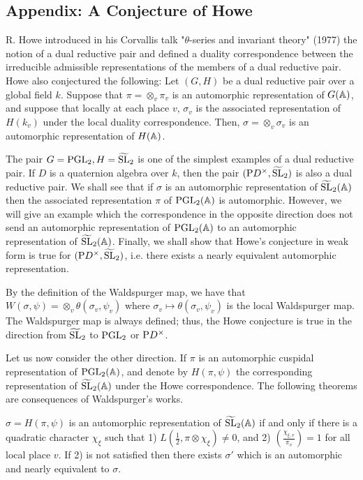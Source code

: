 \begin{appendices}
\section{Appendix: A Conjecture of Howe}

R. Howe introduced in his Corvallis talk "$\theta$-series and invariant theory" (1977) the notion of a dual reductive pair and defined a duality correspondence between the irreducible admissible representations of the members of a dual reductive pair.
Howe also conjectured the following: Let $(G, H)$ be a dual reductive pair over a global field $k$.
Suppose that $\pi = \otimes_v \pi_v$ is an automorphic representation of $G(\mathbb{A})$, and suppose that locally at each place $v$, $\sigma_v$ is the associated representation of $H(k_v)$ under the local duality correspondence.
Then, $\sigma = \otimes_v \sigma_v$ is an automorphic representation of $H(\mathbb{A})$.

The pair $G = \mathrm{PGL}_2, H = \widetilde{\mathrm{SL}}_2$ is one of the simplest examples of a dual reductive pair.
If $D$ is a quaternion algebra over $k$, then the pair $(\mathrm{P} D^\times, \widetilde{\mathrm{SL}}_2)$ is also a dual reductive pair. 
We shall see that if $\sigma$ is an automorphic representation of $\widetilde{\mathrm{SL}}_2(\mathbb{A})$ then the associated representation $\pi$ of $\mathrm{PGL}_2(\mathbb{A})$ is automorphic.
However, we will give an example which the correspondence in the opposite direction does not send an automorphic representation of $\mathrm{PGL}_2(\mathbb{A})$ to an automorphic representation of $\widetilde{\mathrm{SL}}_2(\mathbb{A})$.
Finally, we shall show that Howe's conjecture in weak
form is true for $(\mathrm{P} D^\times, \widetilde{\mathrm{SL}}_2)$, i.e. there exists a nearly equivalent automorphic representation.

By the definition of the Waldspurger map, we have that $W(\sigma, \psi) = \otimes_v \theta(\sigma_v, \psi_v)$ where $\sigma_v \mapsto \theta(\sigma_v, \psi_v)$ is the local Waldspurger map.
The Waldspurger map is always defined; thus, the Howe conjecture is true in the direction from $\widetilde{\mathrm{SL}}_2$ to $\mathrm{PGL}_2$ or $\mathrm{P} D^\times$.

Let us now consider the other direction.
If $\pi$ is an automorphic cuspidal representation of $\mathrm{PGL}_2(\mathbb{A})$, and denote by $H(\pi, \psi)$ the
corresponding representation of $\widetilde{\mathrm{SL}}_2(\mathbb{A})$ under the Howe correspondence.
The following theorems are consequences of Waldspurger's works.

\begin{theorem}
\label{thm:a.1}
$\sigma = H(\pi, \psi)$ is an automorphic representation of $\widetilde{\mathrm{SL}}_2(\mathbb{A})$ if and only if there is a quadratic character $\chi_\xi$ such that 1) $L(\frac{1}{2}, \pi \otimes \chi_\xi) \neq 0$, and 2) $\left(\frac{\chi_{\xi, v}}{\pi_v}\right) = 1$ for all local place $v$.
If 2) is not satisfied then there exists $\sigma'$ which is an automorphic and nearly equivalent to $\sigma$.
\end{theorem}


\end{appendices}

